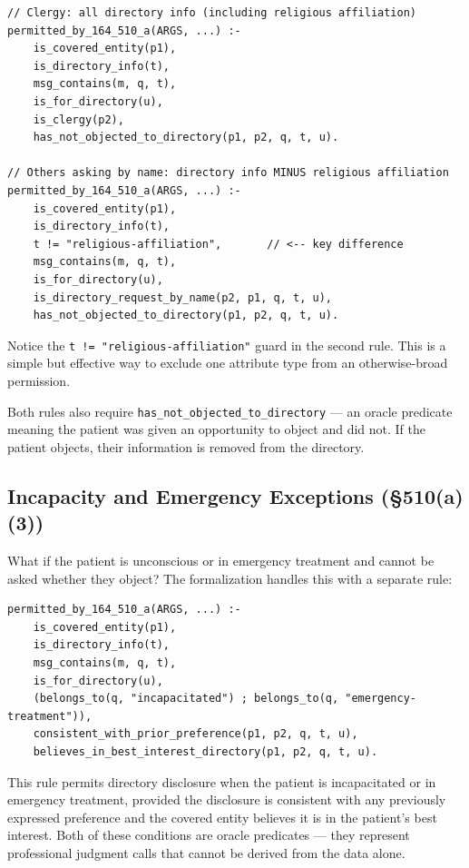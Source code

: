 \documentclass[11pt,letterpaper]{article}
\begin{document}
\begin{lstlisting}[style=soufflestyle,caption={Clergy vs.\ by-name directory lookup (from hipaa\_164\_510.dl)}]
// Clergy: all directory info (including religious affiliation)
permitted_by_164_510_a(ARGS, ...) :-
    is_covered_entity(p1),
    is_directory_info(t),
    msg_contains(m, q, t),
    is_for_directory(u),
    is_clergy(p2),
    has_not_objected_to_directory(p1, p2, q, t, u).

// Others asking by name: directory info MINUS religious affiliation
permitted_by_164_510_a(ARGS, ...) :-
    is_covered_entity(p1),
    is_directory_info(t),
    t != "religious-affiliation",       // <-- key difference
    msg_contains(m, q, t),
    is_for_directory(u),
    is_directory_request_by_name(p2, p1, q, t, u),
    has_not_objected_to_directory(p1, p2, q, t, u).
\end{lstlisting}

Notice the \texttt{t != "religious-affiliation"} guard in the second rule. This is a simple but effective way to exclude one attribute type from an otherwise-broad permission.

Both rules also require \texttt{has\_not\_objected\_to\_directory} --- an oracle predicate meaning the patient was given an opportunity to object and did not. If the patient objects, their information is removed from the directory.

\subsection{Incapacity and Emergency Exceptions (\S 510(a)(3))}

What if the patient is unconscious or in emergency treatment and cannot be asked whether they object? The formalization handles this with a separate rule:

\begin{lstlisting}[style=soufflestyle,caption={Emergency exception for directory (\S 510(a)(3))}]
permitted_by_164_510_a(ARGS, ...) :-
    is_covered_entity(p1),
    is_directory_info(t),
    msg_contains(m, q, t),
    is_for_directory(u),
    (belongs_to(q, "incapacitated") ; belongs_to(q, "emergency-treatment")),
    consistent_with_prior_preference(p1, p2, q, t, u),
    believes_in_best_interest_directory(p1, p2, q, t, u).
\end{lstlisting}

This rule permits directory disclosure when the patient is incapacitated or in emergency treatment, provided the disclosure is consistent with any previously expressed preference and the covered entity believes it is in the patient's best interest. Both of these conditions are oracle predicates --- they represent professional judgment calls that cannot be derived from the data alone.
\end{document}
